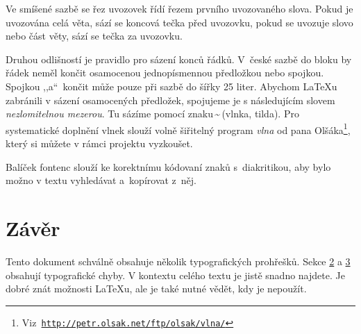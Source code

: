\documentclass[twocolumn, 10pt, a4paper]{article}
\begin{document}
Ve smíšené sazbě se řez uvozovek řídí řezem prvního uvozovaného slova.
Pokud je uvozována celá věta, sází se koncová tečka před uvozovku, pokud se uvozuje slovo nebo část věty, sází se tečka za uvozovku.

Druhou odlišností je pravidlo pro sázení konců řádků.
V~české sazbě do bloku by řádek neměl končit osamocenou jednopísmennou předložkou nebo spojkou.
Spojkou ,,a``~končit může pouze při sazbě do šířky 25 liter.
Abychom \LaTeX u zabránili v sázení osamocených předložek, spojujeme je s následujícím slovem 
\textit{nezlomitelnou mezerou}.
Tu sázíme pomocí znaku\,\textbf{\~}\,(vlnka, tilda).
Pro systematické do\-plnění vlnek slouží volně šiřitelný program \textit{vlna} od pana Olšáka\footnote{Viz\texttt{ \url{http://petr.olsak.net/ftp/olsak/vlna/}}}, který si můžete v rámci projektu vyzkoušet.

Balíček {\selectfont fontenc} slouží ke korektnímu kódovaní znaků s~diakritikou, aby bylo možno v textu vyhledávat a~kopí\-rovat z~něj.

\section{Závěr}

Tento dokument schválně obsahuje několik typografických prohřešků.
Sekce \hyperlink{section.2}{2} a \hyperlink{section.3}{3} obsahují typografické chyby.
V kontextu celého textu je jistě snadno najdete.
Je dobré znát možnosti \LaTeX u, ale je také nutné vědět, kdy je nepoužít.
\end{document}

